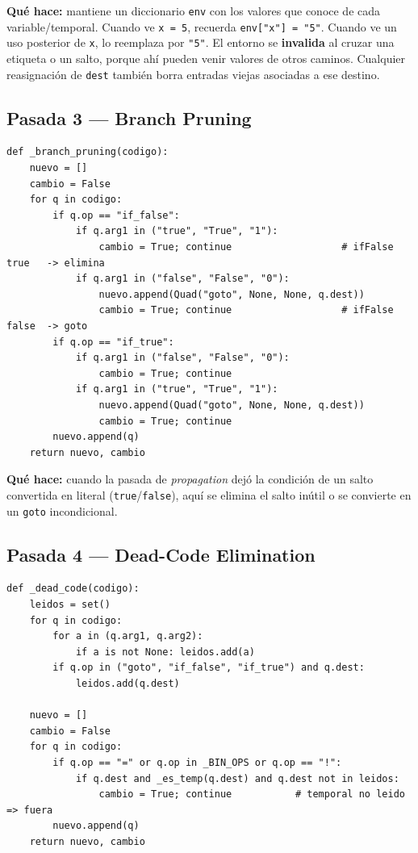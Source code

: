 \documentclass[11pt,a4paper]{article}
\begin{document}
\textbf{Qué hace:} mantiene un diccionario \texttt{env} con los valores que
conoce de cada variable/temporal. Cuando ve \texttt{x = 5}, recuerda
\texttt{env["x"] = "5"}. Cuando ve un uso posterior de \texttt{x}, lo
reemplaza por \texttt{"5"}. El entorno se \textbf{invalida} al cruzar una
etiqueta o un salto, porque ahí pueden venir valores de otros caminos.
Cualquier reasignación de \texttt{dest} también borra entradas viejas
asociadas a ese destino.

\subsection{Pasada 3 --- Branch Pruning}

\begin{lstlisting}[style=py]
def _branch_pruning(codigo):
    nuevo = []
    cambio = False
    for q in codigo:
        if q.op == "if_false":
            if q.arg1 in ("true", "True", "1"):
                cambio = True; continue                   # ifFalse true   -> elimina
            if q.arg1 in ("false", "False", "0"):
                nuevo.append(Quad("goto", None, None, q.dest))
                cambio = True; continue                   # ifFalse false  -> goto
        if q.op == "if_true":
            if q.arg1 in ("false", "False", "0"):
                cambio = True; continue
            if q.arg1 in ("true", "True", "1"):
                nuevo.append(Quad("goto", None, None, q.dest))
                cambio = True; continue
        nuevo.append(q)
    return nuevo, cambio
\end{lstlisting}

\textbf{Qué hace:} cuando la pasada de \textit{propagation} dejó la condición
de un salto convertida en literal (\texttt{true}/\texttt{false}), aquí se
elimina el salto inútil o se convierte en un \texttt{goto} incondicional.

\subsection{Pasada 4 --- Dead-Code Elimination}

\begin{lstlisting}[style=py]
def _dead_code(codigo):
    leidos = set()
    for q in codigo:
        for a in (q.arg1, q.arg2):
            if a is not None: leidos.add(a)
        if q.op in ("goto", "if_false", "if_true") and q.dest:
            leidos.add(q.dest)

    nuevo = []
    cambio = False
    for q in codigo:
        if q.op == "=" or q.op in _BIN_OPS or q.op == "!":
            if q.dest and _es_temp(q.dest) and q.dest not in leidos:
                cambio = True; continue           # temporal no leido => fuera
        nuevo.append(q)
    return nuevo, cambio
\end{lstlisting}
\end{document}
